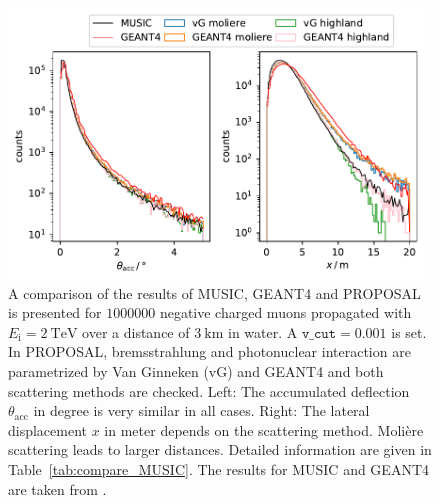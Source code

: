 \documentclass[pdflatex, sn-mathphys]{sn-jnl}%
\theoremstyle{thmstyleone}%
\theoremstyle{thmstyletwo}%
\theoremstyle{thmstylethree}%
\begin{document}
\begin{figure}
    \centering 
    \includegraphics[width=0.98\textwidth]{../../deflection/plots/FINAL/2TeV_1e6events_accumulated_defl_paper_combined.pdf}
    \caption{A comparison of the results of MUSIC, GEANT4 and PROPOSAL is presented for $\num{1000000}$ negative charged muons propagated with 
    $E_{\text{i}} = \SI{2}{\tera\electronvolt}$ over a distance of 
    $\SI{3}{\kilo\meter}$ in water. A $\texttt{v\_cut} = 0.001$ is set. In PROPOSAL, 
    bremsstrahlung and photonuclear interaction are parametrized by 
    Van Ginneken (vG) and GEANT4 and both scattering methods are checked. 
    Left: The accumulated deflection $\theta_{\mathrm{acc}}$ in degree is very similar in all cases.
    Right: The lateral displacement $x$ in meter depends 
    on the scattering method. Molière scattering leads to larger distances.
    Detailed information are given in 
    Table~\ref{tab:compare_MUSIC}. The results for MUSIC and GEANT4 are taken from 
    \cite{comparison_MUSIC_GEANT4_2009}.}
    \label{fig:compare_MUSIC}
\end{figure}
\end{document}
